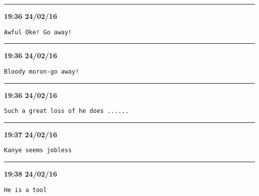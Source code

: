 \hrule%

\begin{adjustwidth}{0cm}{0cm}
\footnotesize \textbf{19:36 24/02/16}

\begin{lstlisting}[breaklines, breakatwhitespace, basicstyle=\small, frame=leftline]
Awful Oke! Go away!
\end{lstlisting}
\end{adjustwidth}

\hrule%

\begin{adjustwidth}{0cm}{0cm}
\footnotesize \textbf{19:36 24/02/16}

\begin{lstlisting}[breaklines, breakatwhitespace, basicstyle=\small, frame=leftline]
Bloody moron-go away!
\end{lstlisting}
\end{adjustwidth}

\hrule%

\begin{adjustwidth}{0cm}{0cm}
\footnotesize \textbf{19:36 24/02/16}

\begin{lstlisting}[breaklines, breakatwhitespace, basicstyle=\small, frame=leftline]
Such a great loss of he does ......
\end{lstlisting}
\end{adjustwidth}

\hrule%

\begin{adjustwidth}{0cm}{0cm}
\footnotesize \textbf{19:37 24/02/16}

\begin{lstlisting}[breaklines, breakatwhitespace, basicstyle=\small, frame=leftline]
Kanye seems jobless
\end{lstlisting}
\end{adjustwidth}

\hrule%

\begin{adjustwidth}{0cm}{0cm}
\footnotesize \textbf{19:38 24/02/16}

\begin{lstlisting}[breaklines, breakatwhitespace, basicstyle=\small, frame=leftline]
He is a tool
\end{lstlisting}
\end{adjustwidth}

